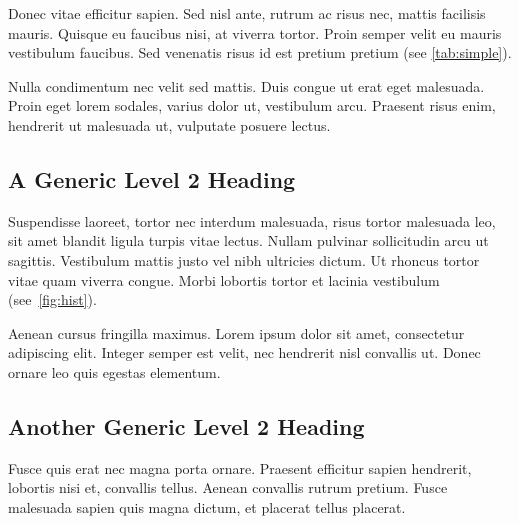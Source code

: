 \documentclass[a4paper,12pt,stu,donotrepeattitle,floatsintext,twoside]{apa7}
\begin{document}
Donec vitae efficitur sapien. Sed nisl ante, rutrum ac risus nec, mattis facilisis mauris. Quisque eu faucibus nisi, at viverra tortor. Proin semper velit eu mauris vestibulum faucibus. Sed venenatis risus id est pretium pretium (see \cref{tab:simple}).

Nulla condimentum nec velit sed mattis. Duis congue ut erat eget malesuada. Proin eget lorem sodales, varius dolor ut, vestibulum arcu. Praesent risus enim, hendrerit ut malesuada ut, vulputate posuere lectus.


\subsection{A Generic Level 2 Heading}

Suspendisse laoreet, tortor nec interdum malesuada, risus tortor malesuada leo, sit amet blandit ligula turpis vitae lectus. Nullam pulvinar sollicitudin arcu ut sagittis. Vestibulum mattis justo vel nibh ultricies dictum. Ut rhoncus tortor vitae quam viverra congue. Morbi lobortis tortor et lacinia vestibulum (see~\cref{fig:hist}).


Aenean cursus fringilla maximus. Lorem ipsum dolor sit amet, consectetur adipiscing elit. Integer semper est velit, nec hendrerit nisl convallis ut. Donec ornare leo quis egestas elementum.

\subsection{Another Generic Level 2 Heading}

Fusce quis erat nec magna porta ornare. Praesent efficitur sapien hendrerit, lobortis nisi et, convallis tellus. Aenean convallis rutrum pretium. Fusce malesuada sapien quis magna dictum, et placerat tellus placerat.
\end{document}
